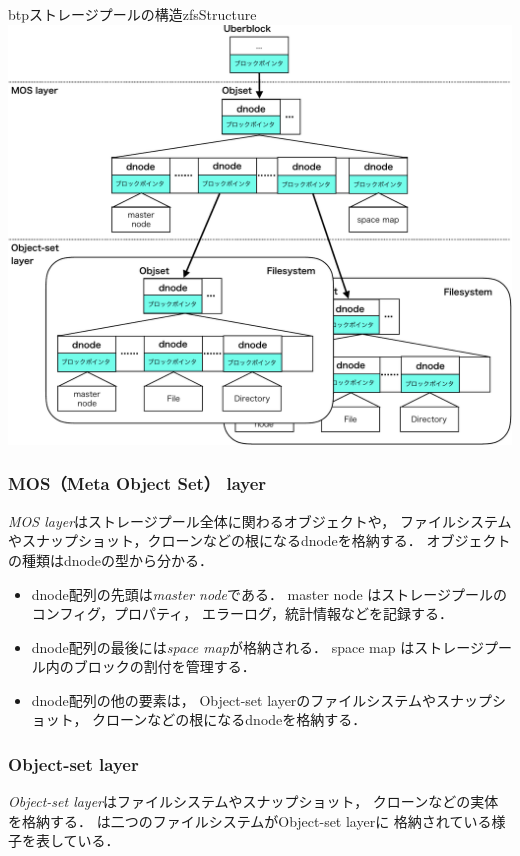 \begin{myfig}{btp}{ストレージプールの構造}{zfsStructure}
  \centering\includegraphics[scale=0.7]{Fig/zfsStructure-crop.pdf}
\end{myfig}

\subsubsection{MOS（Meta Object Set） layer}
\emph{MOS layer}はストレージプール全体に関わるオブジェクトや，
ファイルシステムやスナップショット，クローンなどの根になるdnodeを格納する．
オブジェクトの種類はdnodeの型から分かる．

\begin{itemize}
\item dnode配列の先頭は\emph{master node}である．
  master node はストレージプールのコンフィグ，プロパティ，
  エラーログ，統計情報などを記録する．
\item dnode配列の最後には\emph{space map}が格納される．
  space map はストレージプール内のブロックの割付を管理する．
\item dnode配列の他の要素は，
  Object-set layerのファイルシステムやスナップショット，
  クローンなどの根になるdnodeを格納する．
\end{itemize}

\subsubsection{Object-set layer}
\emph{Object-set layer}はファイルシステムやスナップショット，
クローンなどの実体を格納する．
は二つのファイルシステムがObject-set layerに
格納されている様子を表している．


